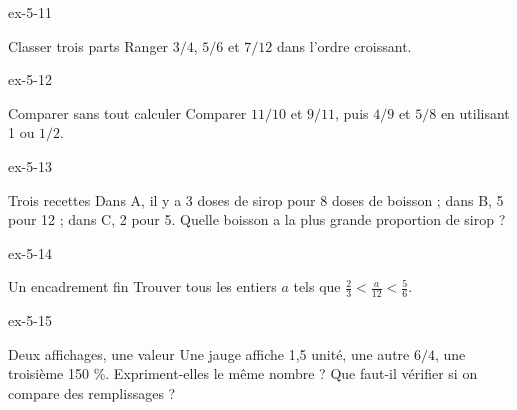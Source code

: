 \begin{blocLivre}{ex-5-11}\begin{exercice}[3]{Classer trois parts}
Ranger $3/4$, $5/6$ et $7/12$ dans l’ordre croissant.
\end{exercice}\end{blocLivre}
\begin{blocLivre}{ex-5-12}\begin{exercice}[3]{Comparer sans tout calculer}
Comparer $11/10$ et $9/11$, puis $4/9$ et $5/8$ en utilisant 1 ou $1/2$.
\end{exercice}\end{blocLivre}
\begin{blocLivre}{ex-5-13}\begin{exercice}[3]{Trois recettes}
Dans A, il y a 3 doses de sirop pour 8 doses de boisson ; dans B, 5 pour 12 ; dans C, 2 pour 5. Quelle boisson a la plus grande proportion de sirop ?
\end{exercice}\end{blocLivre}
\begin{blocLivre}{ex-5-14}\begin{exercice}[3]{Un encadrement fin}
Trouver tous les entiers $a$ tels que $\frac23<\frac a{12}<\frac56$.
\end{exercice}\end{blocLivre}
\begin{blocLivre}{ex-5-15}\begin{exercice}[3]{Deux affichages, une valeur}
Une jauge affiche 1,5 unité, une autre $6/4$, une troisième 150 \%. Expriment-elles le même nombre ? Que faut-il vérifier si on compare des remplissages ?
\end{exercice}\end{blocLivre}

\clearpage
